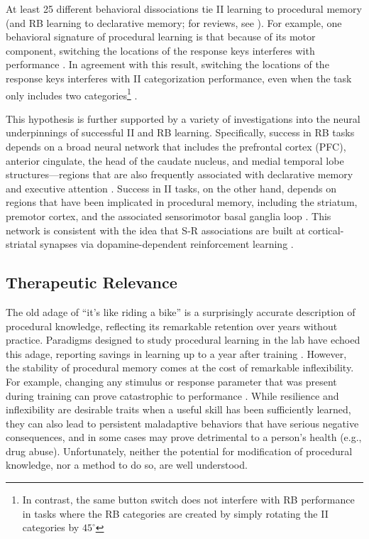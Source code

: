 \documentclass[man,apacite,draftfirst]{apa6}
\begin{document}
At least 25 different behavioral dissociations tie II learning to procedural
memory (and RB learning to declarative memory; for reviews, see
). For example, one
behavioral signature of procedural learning is that because of its motor
component, switching the locations of the response keys interferes with
performance \cite{WillinghamButtonSwitch2000}. In agreement with this result,
switching the locations of the response keys interferes with II categorization
performance, even when the task only includes two categories\footnote{In
contrast, the same button switch does not interfere with RB performance in tasks
where the RB categories are created by simply rotating the II categories by
$45^\circ$} \cite{AshbyEllWaldron2003, MaddoxBohilIng2004, SpieringAshby2008}.

This hypothesis is further supported by a variety of investigations into the
neural underpinnings of successful II and RB learning. Specifically, success in
RB tasks depends on a broad neural network that includes the prefrontal cortex
(PFC), anterior cingulate, the head of the caudate nucleus, and medial temporal
lobe structures---regions that are also frequently associated with declarative
memory and executive attention \cite{BrownMarsden1988, FiloteoEtAl2007,
MuhammadWallisMiller2006, SegerCincotta2006}. Success in II tasks, on the other
hand, depends on regions that have been implicated in procedural memory,
including the striatum, premotor cortex, and the associated sensorimotor basal
ganglia loop \cite{AshbyEnnis2006, FiloteoMaddoxSalmonSong2005,
KnowltonMangelsSquire1996, NomuraEtAl2007}. This network is consistent with the
idea that S-R associations are built at cortical-striatal synapses via
dopamine-dependent reinforcement learning \cite{AshbyCrossley2011,
HoukAdamsBarto1995, joel_actorcritic_2002}.

\subsection*{Therapeutic Relevance}
The old adage of ``it's like riding a bike'' is a surprisingly accurate
description of procedural knowledge, reflecting its remarkable retention over
years without practice. Paradigms designed to study procedural learning in the
lab have echoed this adage, reporting savings in learning up to a year after
training \cite{Romano2010, turner_long-term_2012}. However, the stability of
procedural memory comes at the cost of remarkable inflexibility. For example,
changing any stimulus or response parameter that was present during training can
prove catastrophic to performance \cite{Rozanov_2010, Dienes_1997}. While
resilience and inflexibility are desirable traits when a useful skill has been
sufficiently learned, they can also lead to persistent maladaptive behaviors
that have serious negative consequences, and in some cases may prove detrimental
to a person's health (e.g., drug abuse). Unfortunately, neither the potential
for modification of procedural knowledge, nor a method to do so, are well
understood.
\end{document}

